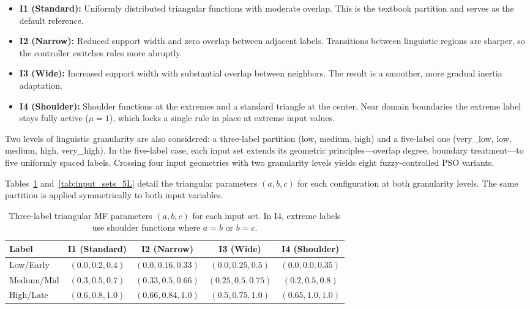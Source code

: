 \documentclass[conference]{IEEEtran}
\begin{document}
\begin{itemize}
    \item \textbf{I1 (Standard):} Uniformly distributed triangular functions with moderate overlap. This is the textbook partition and serves as the default reference.
    \item \textbf{I2 (Narrow):} Reduced support width and zero overlap between adjacent labels. Transitions between linguistic regions are sharper, so the controller switches rules more abruptly.
    \item \textbf{I3 (Wide):} Increased support width with substantial overlap between neighbors. The result is a smoother, more gradual inertia adaptation.
    \item \textbf{I4 (Shoulder):} Shoulder functions at the extremes and a standard triangle at the center. Near domain boundaries the extreme label stays fully active ($\mu = 1$), which locks a single rule in place at extreme input values.
\end{itemize}

Two levels of linguistic granularity are also considered: a three-label partition (low, medium, high) and a five-label one (very\_low, low, medium, high, very\_high). In the five-label case, each input set extends its geometric principles---overlap degree, boundary treatment---to five uniformly spaced labels. Crossing four input geometries with two granularity levels yields eight fuzzy-controlled PSO variants.

Tables~\ref{tab:input_sets_3L} and~\ref{tab:input_sets_5L} detail the triangular parameters $(a, b, c)$ for each configuration at both granularity levels. The same partition is applied symmetrically to both input variables.

\begin{table}[htbp]
    \caption{Three-label triangular MF parameters $(a, b, c)$ for each input set. In I4, extreme labels use shoulder functions where $a{=}b$ or $b{=}c$.}
    \label{tab:input_sets_3L}
    \centering
    \begin{tabular}{lcccc}
    \toprule
    Label & I1 (Standard) & I2 (Narrow) & I3 (Wide) & I4 (Shoulder) \\
    \midrule
    Low/Early   & $(0.0, 0.2, 0.4)$ & $(0.0, 0.16, 0.33)$ & $(0.0, 0.25, 0.5)$ & $(0.0, 0.0, 0.35)$ \\
    Medium/Mid  & $(0.3, 0.5, 0.7)$ & $(0.33, 0.5, 0.66)$ & $(0.25, 0.5, 0.75)$ & $(0.2, 0.5, 0.8)$ \\
    High/Late   & $(0.6, 0.8, 1.0)$ & $(0.66, 0.84, 1.0)$ & $(0.5, 0.75, 1.0)$ & $(0.65, 1.0, 1.0)$ \\
    \bottomrule
    \end{tabular}
\end{table}
\end{document}
